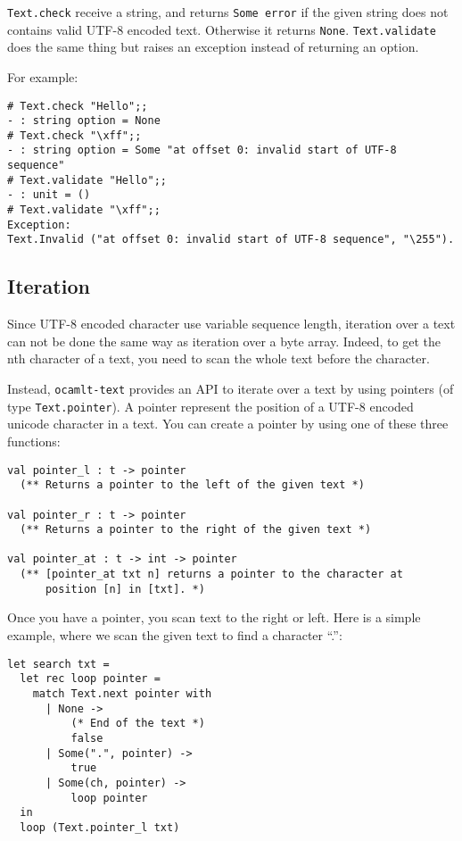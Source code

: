 \documentclass{article}
\newcommand{\oct}{\texttt{ocamlt-text}\xspace}
\begin{document}
\texttt{Text.check} receive a string, and returns \texttt{Some error}
if the given string does not contains valid UTF-8 encoded
text. Otherwise it returns \texttt{None}. \texttt{Text.validate} does
the same thing but raises an exception instead of returning an option.

For example:

\lstset{language=[Objective]Caml}\begin{lstlisting}
# Text.check "Hello";;
- : string option = None
# Text.check "\xff";;
- : string option = Some "at offset 0: invalid start of UTF-8 sequence"
# Text.validate "Hello";;
- : unit = ()
# Text.validate "\xff";;
Exception:
Text.Invalid ("at offset 0: invalid start of UTF-8 sequence", "\255").
\end{lstlisting}

\subsection{Iteration}

Since UTF-8 encoded character use variable sequence length, iteration
over a text can not be done the same way as iteration over a byte
array. Indeed, to get the nth character of a text, you need to scan
the whole text before the character.

Instead, \oct provides an API to iterate over a text by using pointers
(of type \texttt{Text.pointer}). A pointer represent the position of a
UTF-8 encoded unicode character in a text. You can create a pointer by
using one of these three functions:

\lstset{language=[Objective]Caml}\begin{lstlisting}
val pointer_l : t -> pointer
  (** Returns a pointer to the left of the given text *)

val pointer_r : t -> pointer
  (** Returns a pointer to the right of the given text *)

val pointer_at : t -> int -> pointer
  (** [pointer_at txt n] returns a pointer to the character at
      position [n] in [txt]. *)
\end{lstlisting}

Once you have a pointer, you scan text to the right or left. Here is a
simple example, where we scan the given text to find a character ``.'':

\lstset{language=[Objective]Caml}\begin{lstlisting}
let search txt =
  let rec loop pointer =
    match Text.next pointer with
      | None ->
          (* End of the text *)
          false
      | Some(".", pointer) ->
          true
      | Some(ch, pointer) ->
          loop pointer
  in
  loop (Text.pointer_l txt)
\end{lstlisting}
\end{document}
